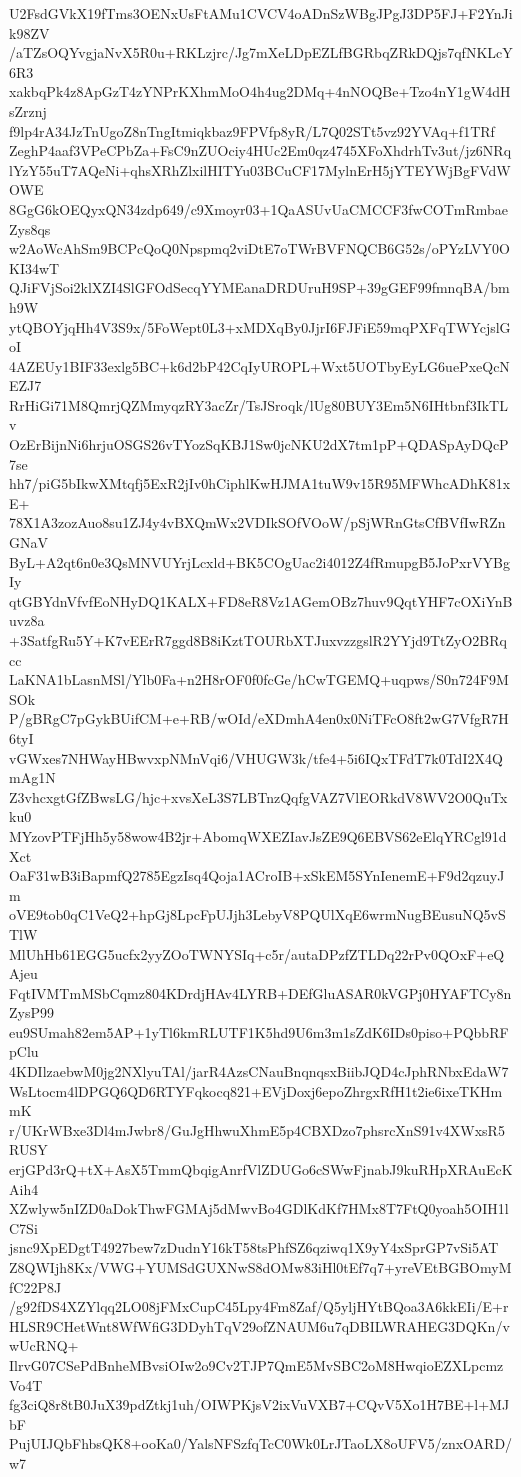U2FsdGVkX19fTms3OENxUsFtAMu1CVCV4oADnSzWBgJPgJ3DP5FJ+F2YnJik98ZV
/aTZsOQYvgjaNvX5R0u+RKLzjrc/Jg7mXeLDpEZLfBGRbqZRkDQjs7qfNKLcY6R3
xakbqPk4z8ApGzT4zYNPrKXhmMoO4h4ug2DMq+4nNOQBe+Tzo4nY1gW4dHsZrznj
f9lp4rA34JzTnUgoZ8nTngItmiqkbaz9FPVfp8yR/L7Q02STt5vz92YVAq+f1TRf
ZeghP4aaf3VPeCPbZa+FsC9nZUOciy4HUc2Em0qz4745XFoXhdrhTv3ut/jz6NRq
lYzY55uT7AQeNi+qhsXRhZlxilHITYu03BCuCF17MylnErH5jYTEYWjBgFVdWOWE
8GgG6kOEQyxQN34zdp649/c9Xmoyr03+1QaASUvUaCMCCF3fwCOTmRmbaeZys8qs
w2AoWcAhSm9BCPcQoQ0Npspmq2viDtE7oTWrBVFNQCB6G52s/oPYzLVY0OKI34wT
QJiFVjSoi2klXZI4SlGFOdSecqYYMEanaDRDUruH9SP+39gGEF99fmnqBA/bmh9W
ytQBOYjqHh4V3S9x/5FoWept0L3+xMDXqBy0JjrI6FJFiE59mqPXFqTWYcjslGoI
4AZEUy1BIF33exlg5BC+k6d2bP42CqIyUROPL+Wxt5UOTbyEyLG6uePxeQcNEZJ7
RrHiGi71M8QmrjQZMmyqzRY3acZr/TsJSroqk/lUg80BUY3Em5N6IHtbnf3IkTLv
OzErBijnNi6hrjuOSGS26vTYozSqKBJ1Sw0jcNKU2dX7tm1pP+QDASpAyDQcP7se
hh7/piG5bIkwXMtqfj5ExR2jIv0hCiphlKwHJMA1tuW9v15R95MFWhcADhK81xE+
78X1A3zozAuo8su1ZJ4y4vBXQmWx2VDIkSOfVOoW/pSjWRnGtsCfBVfIwRZnGNaV
ByL+A2qt6n0e3QsMNVUYrjLcxld+BK5COgUac2i4012Z4fRmupgB5JoPxrVYBgIy
qtGBYdnVfvfEoNHyDQ1KALX+FD8eR8Vz1AGemOBz7huv9QqtYHF7cOXiYnBuvz8a
+3SatfgRu5Y+K7vEErR7ggd8B8iKztTOURbXTJuxvzzgslR2YYjd9TtZyO2BRqcc
LaKNA1bLasnMSl/Ylb0Fa+n2H8rOF0f0fcGe/hCwTGEMQ+uqpws/S0n724F9MSOk
P/gBRgC7pGykBUifCM+e+RB/wOId/eXDmhA4en0x0NiTFcO8ft2wG7VfgR7H6tyI
vGWxes7NHWayHBwvxpNMnVqi6/VHUGW3k/tfe4+5i6IQxTFdT7k0TdI2X4QmAg1N
Z3vhcxgtGfZBwsLG/hjc+xvsXeL3S7LBTnzQqfgVAZ7VlEORkdV8WV2O0QuTxku0
MYzovPTFjHh5y58wow4B2jr+AbomqWXEZIavJsZE9Q6EBVS62eElqYRCgl91dXct
OaF31wB3iBapmfQ2785EgzIsq4Qoja1ACroIB+xSkEM5SYnIenemE+F9d2qzuyJm
oVE9tob0qC1VeQ2+hpGj8LpcFpUJjh3LebyV8PQUlXqE6wrmNugBEusuNQ5vSTlW
MlUhHb61EGG5ucfx2yyZOoTWNYSIq+c5r/autaDPzfZTLDq22rPv0QOxF+eQAjeu
FqtIVMTmMSbCqmz804KDrdjHAv4LYRB+DEfGluASAR0kVGPj0HYAFTCy8nZysP99
eu9SUmah82em5AP+1yTl6kmRLUTF1K5hd9U6m3m1sZdK6IDs0piso+PQbbRFpClu
4KDIlzaebwM0jg2NXlyuTAl/jarR4AzsCNauBnqnqsxBiibJQD4cJphRNbxEdaW7
WsLtocm4lDPGQ6QD6RTYFqkocq821+EVjDoxj6epoZhrgxRfH1t2ie6ixeTKHmmK
r/UKrWBxe3Dl4mJwbr8/GuJgHhwuXhmE5p4CBXDzo7phsrcXnS91v4XWxsR5RUSY
erjGPd3rQ+tX+AsX5TmmQbqigAnrfVlZDUGo6cSWwFjnabJ9kuRHpXRAuEcKAih4
XZwlyw5nIZD0aDokThwFGMAj5dMwvBo4GDlKdKf7HMx8T7FtQ0yoah5OIH1lC7Si
jsnc9XpEDgtT4927bew7zDudnY16kT58tsPhfSZ6qziwq1X9yY4xSprGP7vSi5AT
Z8QWIjh8Kx/VWG+YUMSdGUXNwS8dOMw83iHl0tEf7q7+yreVEtBGBOmyMfC22P8J
/g92fDS4XZYlqq2LO08jFMxCupC45Lpy4Fm8Zaf/Q5yljHYtBQoa3A6kkEIi/E+r
HLSR9CHetWnt8WfWfiG3DDyhTqV29ofZNAUM6u7qDBILWRAHEG3DQKn/vwUcRNQ+
IlrvG07CSePdBnheMBvsiOIw2o9Cv2TJP7QmE5MvSBC2oM8HwqioEZXLpcmzVo4T
fg3ciQ8r8tB0JuX39pdZtkj1uh/OIWPKjsV2ixVuVXB7+CQvV5Xo1H7BE+l+MJbF
PujUIJQbFhbsQK8+ooKa0/YalsNFSzfqTcC0Wk0LrJTaoLX8oUFV5/znxOARD/w7
